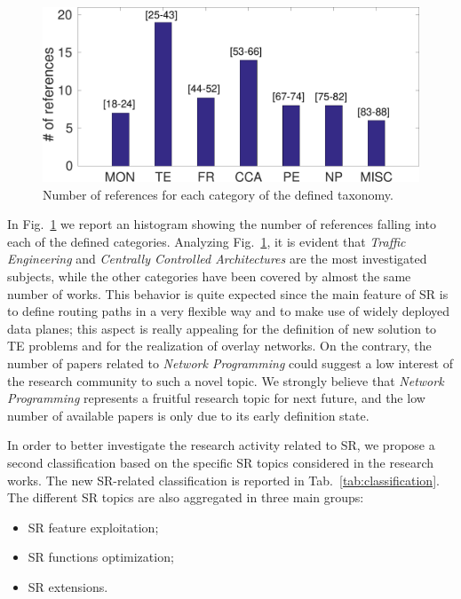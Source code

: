 \begin{figure}
    \centering
    \includegraphics[width=1\columnwidth]{fig/taxonomy1.pdf}
    \caption{Number of references for each category of the defined taxonomy.}
    \label{fig:taxonomy1}
\end{figure}

In Fig.~\ref{fig:taxonomy1} we report an histogram showing the number of references falling into each of the defined categories.
Analyzing Fig.~\ref{fig:taxonomy1}, it is evident that \emph{Traffic Engineering} and \emph{Centrally Controlled Architectures} are the most investigated subjects, while the other categories have been covered by almost the same number of works.
This behavior is quite expected since the main feature of SR is to define routing paths in a very flexible way and to make use of widely deployed data planes; this aspect is really appealing for the definition of new solution to TE problems and for the realization of overlay networks.
On the contrary, the number of papers related to \emph{Network Programming} could suggest a low interest of the research community to such a novel topic. We strongly believe that \emph{Network Programming} represents a fruitful research topic for next future, and the low number of available papers is only due to its early definition state.

In order to better investigate the research activity related to SR, we propose a second classification based on the specific SR topics considered in the research works. The new SR-related classification is reported in Tab.~\ref{tab:classification}. The different SR topics are also aggregated in three main groups:
\begin{itemize}
    \item SR feature exploitation;
    \item SR functions optimization;
    \item SR extensions.
\end{itemize}


